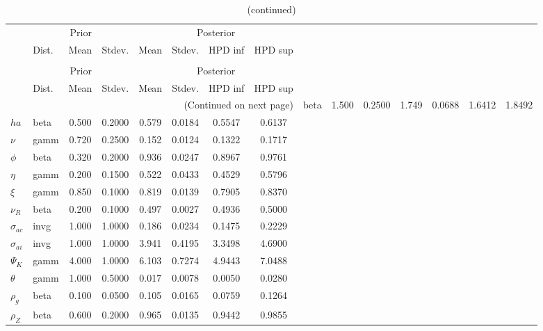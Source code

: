  
\begin{center}
\begin{longtable}{llcccccc} 
\caption{Results from Metropolis-Hastings (parameters)}
 \label{Table:MHPosterior:1}\\
\toprule 
  & \multicolumn{3}{c}{Prior}  &  \multicolumn{4}{c}{Posterior} \\
  \cmidrule(r{.75em}){2-4} \cmidrule(r{.75em}){5-8}
  & Dist. & Mean  & Stdev. & Mean & Stdev. & HPD inf & HPD sup\\
\midrule \endfirsthead 
\caption{(continued)}\\\toprule 
  & \multicolumn{3}{c}{Prior}  &  \multicolumn{4}{c}{Posterior} \\
  \cmidrule(r{.75em}){2-4} \cmidrule(r{.75em}){5-8}
  & Dist. & Mean  & Stdev. & Mean & Stdev. & HPD inf & HPD sup\\
\midrule \endhead 
\bottomrule \multicolumn{8}{r}{(Continued on next page)} \endfoot 
\bottomrule \endlastfoot 
${\sigma}$ & beta &   1.500 & 0.2500 &   1.749& 0.0688 &  1.6412 &  1.8492 \\ 
${ha}$ & beta &   0.500 & 0.2000 &   0.579& 0.0184 &  0.5547 &  0.6137 \\ 
$\nu$ & gamm &   0.720 & 0.2500 &   0.152& 0.0124 &  0.1322 &  0.1717 \\ 
${\phi}$ & beta &   0.320 & 0.2000 &   0.936& 0.0247 &  0.8967 &  0.9761 \\ 
${\eta}$ & gamm &   0.200 & 0.1500 &   0.522& 0.0433 &  0.4529 &  0.5796 \\ 
$\xi$ & gamm &   0.850 & 0.1000 &   0.819& 0.0139 &  0.7905 &  0.8370 \\ 
${\nu_R}$ & beta &   0.200 & 0.1000 &   0.497& 0.0027 &  0.4936 &  0.5000 \\ 
${\sigma_{ac}}$ & invg &   1.000 & 1.0000 &   0.186& 0.0234 &  0.1475 &  0.2229 \\ 
${\sigma_{ai}}$ & invg &   1.000 & 1.0000 &   3.941& 0.4195 &  3.3498 &  4.6900 \\ 
${\Psi_{K}}$ & gamm &   4.000 & 1.0000 &   6.103& 0.7274 &  4.9443 &  7.0488 \\ 
${\theta}$ & gamm &   1.000 & 0.5000 &   0.017& 0.0078 &  0.0050 &  0.0280 \\ 
${\rho_g}$ & beta &   0.100 & 0.0500 &   0.105& 0.0165 &  0.0759 &  0.1264 \\ 
${\rho_Z}$ & beta &   0.600 & 0.2000 &   0.965& 0.0135 &  0.9442 &  0.9855 \\ 

\end{longtable}
\end{center}
